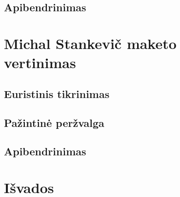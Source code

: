 \documentclass[oneside]{VUMIFPSkursinis}
\begin{document}
\subsection{Apibendrinimas}
\section{Michal Stankevič maketo vertinimas}
\subsection{Euristinis tikrinimas}
\subsection{Pažintinė peržvalga}
\subsection{Apibendrinimas}
\section{Išvados}
\end{document}
